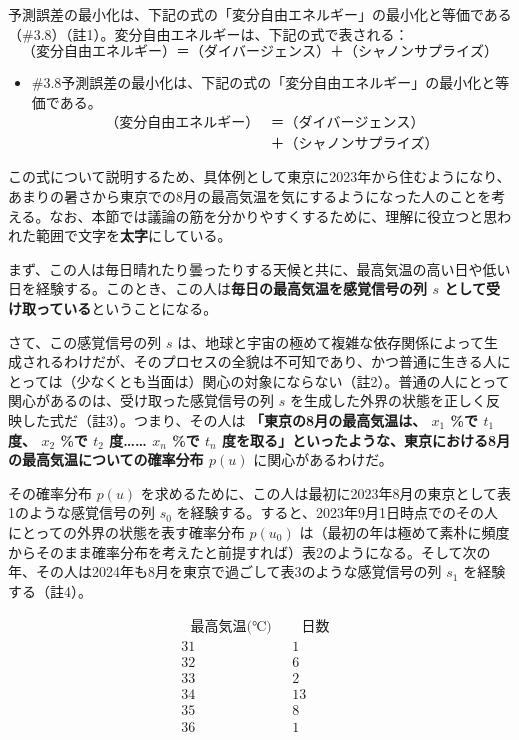 予測誤差の最小化は、下記の式の「変分自由エネルギー」の最小化と等価である（\#3.8）（註1）。変分自由エネルギーは、下記の式で表される：
\[
（変分自由エネルギー）＝（ダイバージェンス）＋（シャノンサプライズ）\tag{1}
\]

\begin{note}{}
  \begin{itemize}
    \tightlist
    \item{\#3.8}予測誤差の最小化は、下記の式の「変分自由エネルギー」の最小化と等価である。$$\begin{aligned}（変分自由エネルギー）&＝（ダイバージェンス）\\ &＋（シャノンサプライズ）\end{aligned}$$
  \end{itemize}
\end{note}

この式について説明するため、具体例として東京に2023年から住むようになり、あまりの暑さから東京での8月の最高気温を気にするようになった人のことを考える。なお、本節では議論の筋を分かりやすくするために、理解に役立つと思われた範囲で文字を\textbf{太字}にしている。

まず、この人は毎日晴れたり曇ったりする天候と共に、最高気温の高い日や低い日を経験する。このとき、この人は\textbf{毎日の最高気温を感覚信号の列
\(s\) として受け取っている}ということになる。

さて、この感覚信号の列 \(s\)
は、地球と宇宙の極めて複雑な依存関係によって生成されるわけだが、そのプロセスの全貌は不可知であり、かつ普通に生きる人にとっては（少なくとも当面は）関心の対象にならない（註2）。普通の人にとって関心があるのは、受け取った感覚信号の列
\(s\) を生成した外界の状態を正しく反映した式だ（註3）。つまり、その人は
\textbf{「東京の8月の最高気温は、 \(x_1\) \%で \(t_1\) 度、 \(x_2\) \%で
\(t_2\) 度\ldots\ldots{} \(x_n\) \%で \(t_n\)
度を取る」といったような、東京における8月の最高気温についての確率分布
\(p(u)\)} に関心があるわけだ。

その確率分布 \(p(u)\)
を求めるために、この人は最初に2023年8月の東京として表1のような感覚信号の列
\(s_0\)
を経験する。すると、2023年9月1日時点でのその人にとっての外界の状態を表す確率分布
\(p(u_0)\)
は（最初の年は極めて素朴に頻度からそのまま確率分布を考えたと前提すれば）表2のようになる。そして次の年、その人は2024年も8月を東京で過ごして表3のような感覚信号の列
\(s_1\) を経験する（註4）。

\[
\begin{array}{cc}
~~~\textrm{最高気温(℃)}~~~ & ~~~\textrm{日数}~~~ \\
\hline
\textrm{31} & \textrm{1} \\
\textrm{32} & \textrm{6} \\
\textrm{33} & \textrm{2} \\
\textrm{34} & \textrm{13} \\
\textrm{35} & \textrm{8} \\
\textrm{36} & \textrm{1}
\end{array}
\tag{表1}
\]

